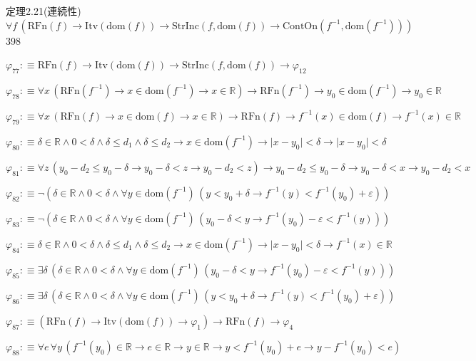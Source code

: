 \begin{fullproof}{定理2.21(連続性)}{$\forall f\,(\mathrm{RFn}(f) \to \mathrm{Itv}(\mathrm{dom}(f)) \to \mathrm{StrInc}(f,\mathrm{dom}(f)) \to \mathrm{ContOn}(f^{-1},\mathrm{dom}(f^{-1})))$}{398}
\begin{abbrevlist}
\item $\varphi_{77} :\equiv \mathrm{RFn}(f) \to \mathrm{Itv}(\mathrm{dom}(f)) \to \mathrm{StrInc}(f,\mathrm{dom}(f)) \to \varphi_{12}$
\item $\varphi_{78} :\equiv \forall x\,(\mathrm{RFn}(f^{-1}) \to x \in \mathrm{dom}(f^{-1}) \to x \in \mathbb{R}) \to \mathrm{RFn}(f^{-1}) \to y_{0} \in \mathrm{dom}(f^{-1}) \to y_{0} \in \mathbb{R}$
\item $\varphi_{79} :\equiv \forall x\,(\mathrm{RFn}(f) \to x \in \mathrm{dom}(f) \to x \in \mathbb{R}) \to \mathrm{RFn}(f) \to f^{-1}(x) \in \mathrm{dom}(f) \to f^{-1}(x) \in \mathbb{R}$
\item $\varphi_{80} :\equiv \delta \in \mathbb{R} \land 0 < \delta \land \delta \leq d_{1} \land \delta \leq d_{2} \to x \in \mathrm{dom}(f^{-1}) \to \lvert x - y_{0} \rvert < \delta \to \lvert x - y_{0} \rvert < \delta$
\item $\varphi_{81} :\equiv \forall z\,(y_{0} - d_{2} \leq y_{0} - \delta \to y_{0} - \delta < z \to y_{0} - d_{2} < z) \to y_{0} - d_{2} \leq y_{0} - \delta \to y_{0} - \delta < x \to y_{0} - d_{2} < x$
\item $\varphi_{82} :\equiv \neg (\delta \in \mathbb{R} \land 0 < \delta \land \forall y \in \mathrm{dom}(f^{-1})\,(y < y_{0} + \delta \to f^{-1}(y) < f^{-1}(y_{0}) + \varepsilon))$
\item $\varphi_{83} :\equiv \neg (\delta \in \mathbb{R} \land 0 < \delta \land \forall y \in \mathrm{dom}(f^{-1})\,(y_{0} - \delta < y \to f^{-1}(y_{0}) - \varepsilon < f^{-1}(y)))$
\item $\varphi_{84} :\equiv \delta \in \mathbb{R} \land 0 < \delta \land \delta \leq d_{1} \land \delta \leq d_{2} \to x \in \mathrm{dom}(f^{-1}) \to \lvert x - y_{0} \rvert < \delta \to f^{-1}(x) \in \mathbb{R}$
\item $\varphi_{85} :\equiv \exists \delta\,(\delta \in \mathbb{R} \land 0 < \delta \land \forall y \in \mathrm{dom}(f^{-1})\,(y_{0} - \delta < y \to f^{-1}(y_{0}) - \varepsilon < f^{-1}(y)))$
\item $\varphi_{86} :\equiv \exists \delta\,(\delta \in \mathbb{R} \land 0 < \delta \land \forall y \in \mathrm{dom}(f^{-1})\,(y < y_{0} + \delta \to f^{-1}(y) < f^{-1}(y_{0}) + \varepsilon))$
\item $\varphi_{87} :\equiv (\mathrm{RFn}(f) \to \mathrm{Itv}(\mathrm{dom}(f)) \to \varphi_{1}) \to \mathrm{RFn}(f) \to \varphi_{4}$
\item $\varphi_{88} :\equiv \forall e\,\forall y\,(f^{-1}(y_{0}) \in \mathbb{R} \to e \in \mathbb{R} \to y \in \mathbb{R} \to y < f^{-1}(y_{0}) + e \to y - f^{-1}(y_{0}) < e)$

\end{abbrevlist}
\end{fullproof}

